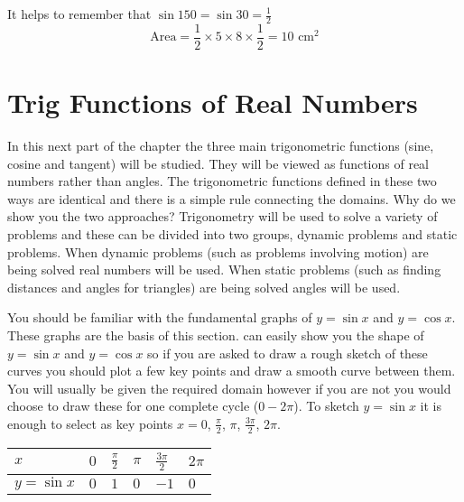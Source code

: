 It helps to remember that $\sin  150 =\sin  30 =\frac{1}{2}$
\begin{equation*}\text{Area} =\frac{1}{2} \times 5 \times 8 \times \frac{1}{2} =10 \text{ cm}^{2}
\end{equation*}

\section{Trig Functions of Real Numbers}
In this next part of the chapter the three main trigonometric functions (sine, cosine and tangent) will be studied. They will be viewed as functions of real numbers rather than angles. The trigonometric functions defined in these two ways are identical and there is a simple rule connecting the domains. Why do we show you the two approaches? Trigonometry will be used to solve a variety of problems and these can be divided into two groups, dynamic problems and static problems. When dynamic problems (such as problems involving motion) are being solved real numbers will be used. When static problems (such as finding distances and angles for triangles) are being solved angles will be used. 

You should be familiar with the fundamental graphs of $y =\sin  x$ and $y =\cos  x$. These graphs are the basis of this section. \Desmos can easily show you the shape of $y =\sin  x$ and $y =\cos  x$ so if you are asked to draw a rough sketch of these curves you should plot a few key points and draw a smooth curve between them. You will usually be given the required domain however if you are not you would choose to draw these for one complete cycle ($0 -2 \pi $). To sketch $y =\sin  x$ it is enough to select as key points $x =0$, $\frac{\pi }{2}$, $\pi $, $\frac{3 \pi }{2}$, $2 \pi $. 


\begin{tabular}[c]{|l|l|l|l|l|l|}\hline
	$x$  & $0$  & $\frac{\pi }{2}$  & $\pi $  & $\frac{3 \pi }{2}$  & $2 \pi $  \\
	\hline
	$y =\sin  x$  & $0$  & $1$  & $0$  & $ -1$  & $0$  \\
	\hline
\end{tabular}

